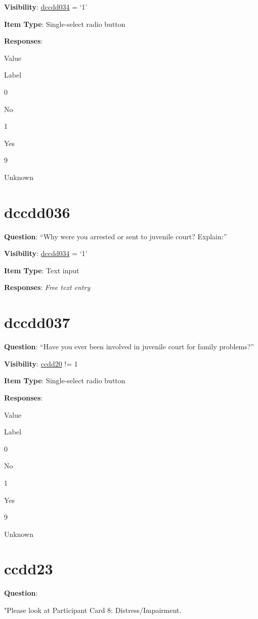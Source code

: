 \documentclass[]{book}
\begin{document}
\textbf{Visibility}: \protect\hyperlink{dccdd034}{dccdd034} = `1'

\textbf{Item Type}: Single-select radio button

\textbf{Responses}:

Value

Label

0

No

1

Yes

9

Unknown

\hypertarget{dccdd036}{%
\section{dccdd036}\label{dccdd036}}

\textbf{Question}: ``Why were you arrested or sent to juvenile court? Explain:''

\textbf{Visibility}: \protect\hyperlink{dccdd034}{dccdd034} = `1'

\textbf{Item Type}: Text input

\textbf{Responses}: \emph{Free text entry}

\hypertarget{dccdd037}{%
\section{dccdd037}\label{dccdd037}}

\textbf{Question}: ``Have you ever been involved in juvenile court for family problems?''

\textbf{Visibility}: \protect\hyperlink{ccdd20}{ccdd20} != 1

\textbf{Item Type}: Single-select radio button

\textbf{Responses}:

Value

Label

0

No

1

Yes

9

Unknown

\hypertarget{ccdd23}{%
\section{ccdd23}\label{ccdd23}}

\textbf{Question}:

"Please look at Participant Card 8: Distress/Impairment.
\end{document}
